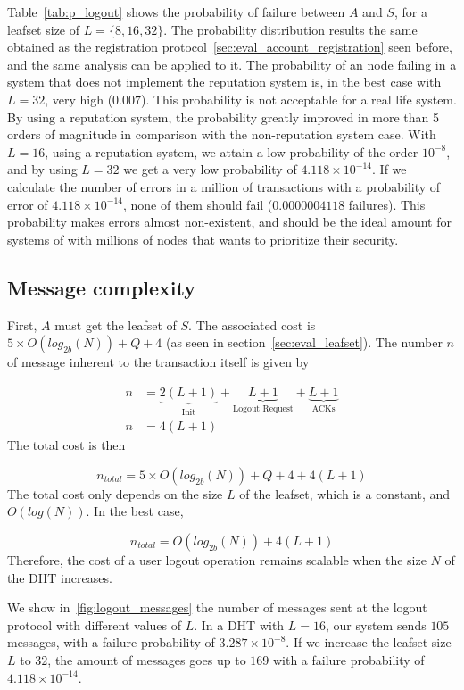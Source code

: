     Table~\eqref{tab:p_logout} shows the probability of failure
between $A$ and $S$, for a leafset size of $L = \{8,16,32\}$.
  The probability distribution results the same obtained as the registration
protocol~\ref{sec:eval_account_registration} seen before, and the same analysis
can be applied to it. The probability
of an node failing in a system that does not implement the reputation system
is, in the best case with $L=32$, very high ($0.007$). This probability is not
acceptable for a real life system.  By using a reputation system, the probability greatly
improved in more than 5 orders of magnitude in comparison with the
non-reputation system case. With $L=16$, using a reputation system, we attain
a low probability of the order $10^{-8}$, and by using $L=32$ we get a very low
probability of $4.118 \times 10^{-14}$. If we calculate the number of
errors in a million of transactions with a probability of error of $4.118
\times 10^{-14}$, none of them should fail ($0.0000004118$ failures). This probability
makes errors almost non-existent, and should be the ideal amount for systems of with
millions of nodes that wants to prioritize their security.

    
  \subsection{Message complexity}
    First, $A$ must get the leafset of $S$. The associated cost is $5
\times O(log_{2b}(N)) + Q + 4$ (as seen in section~\ref{sec:eval_leafset}).
    The number $n$ of message inherent to the transaction itself is given by

    \begin{align}
      n &= \underbrace{2(L+1)}_\text{Init} +  \underbrace{L+1}_\text{Logout Request} + \underbrace{L+1}_\text{ACKs}\\
      n &= 4(L+1)
    \end{align}
     The total cost is then

    $$
      n_{total} = 5 \times O(log_{2b}(N)) + Q + 4 + 4(L+1)
    $$    
    The total cost only depends on the size $L$ of the leafset, which is a
constant, and $O(log(N))$. In the best case, 

    $$
      n_{total} = O(log_{2b}(N)) + 4(L+1)
    $$
    Therefore, the cost of a user logout operation remains scalable when the size $N$ of the DHT increases.

    We show in~\ref{fig:logout_messages} the number of messages sent at
the logout protocol with different values of $L$. In a DHT with
$L = 16$, our system sends $105$ messages, with a failure probability of
 $3.287 \times 10^{-8}$. If we increase the leafset size $L$ to $32$, the amount of
messages goes up to $169$ with a failure probability of $4.118 \times 10^{-14}$.


